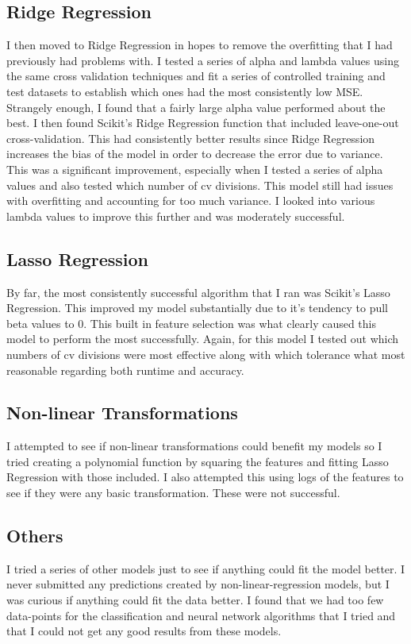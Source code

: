 \documentclass[10pt]{amsart}
\begin{document}
\subsection{Ridge Regression}
I then moved to Ridge Regression in hopes to remove the overfitting that I had previously had problems with.  I tested a series of alpha and lambda values using the same cross validation techniques and fit a series of controlled training and test datasets to establish which ones had the most consistently low MSE.  Strangely enough, I found that a fairly large alpha value performed about the best.  I then found Scikit's Ridge Regression function that included leave-one-out cross-validation.  This had consistently better results since Ridge Regression increases the bias of the model in order to decrease the error due to variance.  This was a significant improvement, especially when I tested a series of alpha values and also tested which number of cv divisions.  This model still had issues with overfitting and accounting for too much variance.  I looked into various lambda values to improve this further and was moderately successful.

\subsection{Lasso Regression}
By far, the most consistently successful algorithm that I ran was Scikit's Lasso Regression.  This improved my model substantially due to it's tendency to pull beta values to 0.  This built in feature selection was what clearly caused this model to perform the most successfully.  Again, for this model I tested out which numbers of cv divisions were most effective along with which tolerance what most reasonable regarding both runtime and accuracy.

\subsection{Non-linear Transformations}
I attempted to see if non-linear transformations could benefit my models so I tried creating a polynomial function by squaring the features and fitting Lasso Regression with those included.  I also attempted this using logs of the features to see if they were any basic transformation.  These were not successful.

\subsection{Others}
I tried a series of other models just to see if anything could fit the model better.  I never submitted any predictions created by non-linear-regression models, but I was curious if anything could fit the data better.  I found that we had too few data-points for the classification and neural network algorithms that I tried and that I could not get any good results from these models.
\end{document}
